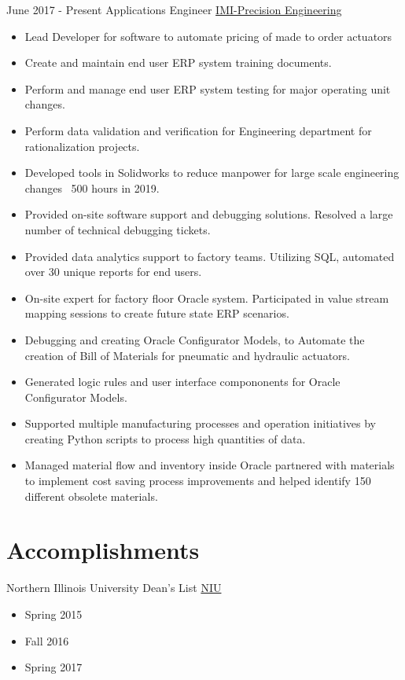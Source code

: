 \documentclass[letterpaper]{twentysecondcv} %
\begin{document}
\begin{twenty} %
\twentyitem
    	{June 2017 -}
		{Present}
        {Applications Engineer}
        {\href{https://www.imi-precision.com/us/en/}{IMI-Precision Engineering}}
        {}
        {\begin{itemize}
        \item Lead Developer for software to automate pricing of made to order actuators
        \item Create and maintain end user ERP system training documents.
        \item Perform and manage end user ERP system testing for major operating unit changes. 
        \item Perform data validation and verification for Engineering department for rationalization projects. 
        \item Developed tools in Solidworks to reduce manpower for large scale engineering changes ~500 hours in 2019.
        \item Provided on-site software support and debugging solutions. Resolved a large number of technical debugging tickets.
        \item Provided data analytics support to factory teams. Utilizing SQL, automated over 30 unique reports for end users. 
        \item On-site expert for factory floor Oracle system. Participated in value stream mapping sessions to create future state ERP scenarios.
        \item Debugging and creating Oracle Configurator Models, to Automate the creation of Bill of Materials for pneumatic and hydraulic actuators.
        \item Generated logic rules and user interface compononents for Oracle Configurator Models. 
        \item Supported multiple manufacturing processes and operation initiatives by creating Python scripts to process high quantities of data.
        \item Managed material flow and inventory inside Oracle partnered with materials to implement cost saving process improvements and helped identify 150 different obsolete materials.  
        \end{itemize}}
      

        
\end{twenty}
\section{Accomplishments}
\begin{twenty}
\twentyitem
	{}
	{}
	{Northern Illinois University Dean's List}
	{\href{https://www.niu.edu/index.shtml}{NIU}}
	{}
	{\begin{itemize}
			\item Spring 2015
			\item Fall 2016
			\item Spring 2017
	\end{itemize}}
\end{twenty}
\end{document}
